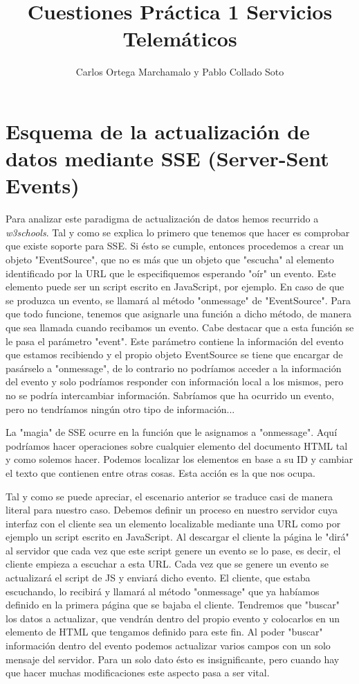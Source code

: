 \documentclass{article}[13pt]
\title{Cuestiones Práctica 1 Servicios Telemáticos}
\author{Carlos Ortega Marchamalo y Pablo Collado Soto}
\date{}
\begin{document}
  \maketitle

  \section{Esquema de la actualización de datos mediante SSE (Server-Sent Events)}
    Para analizar este paradigma de actualización de datos hemos recurrido a \textit{w3schools}. Tal y como se explica lo primero que tenemos que hacer es comprobar que existe soporte para SSE. Si ésto se cumple, entonces procedemos a crear un objeto "EventSource", que no es más que un objeto que "escucha" al elemento identificado por la URL que le especifiquemos esperando "oír" un evento. Este elemento puede ser un script escrito en JavaScript, por ejemplo. En caso de que se produzca un evento, se llamará al método "onmessage" de "EventSource". Para que todo funcione, tenemos que asignarle una función a dicho método, de manera que sea llamada cuando recibamos un evento. Cabe destacar que a esta función se le pasa el parámetro "event". Este parámetro contiene la información del evento que estamos recibiendo y el propio objeto EventSource se tiene que encargar de pasárselo a "onmessage", de lo contrario no podríamos acceder a la información del evento y solo podríamos responder con información local a los mismos, pero no se podría intercambiar información. Sabríamos que ha ocurrido un evento, pero no tendríamos ningún otro tipo de información...

    La "magia" de SSE ocurre en la función que le asignamos a "onmessage". Aquí podríamos hacer operaciones sobre cualquier elemento del documento HTML tal y como solemos hacer. Podemos localizar los elementos en base a su ID y cambiar el texto que contienen entre otras cosas. Esta acción es la que nos ocupa.

    Tal y como se puede apreciar, el escenario anterior se traduce casi de manera literal para nuestro caso. Debemos definir un proceso en nuestro servidor cuya interfaz con el cliente sea un elemento localizable mediante una URL como por ejemplo un script escrito en JavaScript. Al descargar el cliente la página le "dirá" al servidor que cada vez que este script genere un evento se lo pase, es decir, el cliente empieza a escuchar a esta URL. Cada vez que se genere un evento se actualizará el script de JS y enviará dicho evento. El cliente, que estaba escuchando, lo recibirá y llamará al método "onmessage" que ya habíamos definido en la primera página que se bajaba el cliente. Tendremos que "buscar" los datos a actualizar, que vendrán dentro del propio evento y colocarlos en un elemento de HTML que tengamos definido para este fin. Al poder "buscar" información dentro del evento podemos actualizar varios campos con un solo mensaje del servidor. Para un solo dato ésto es insignificante, pero cuando hay que hacer muchas modificaciones este aspecto pasa a ser vital.
\end{document}
